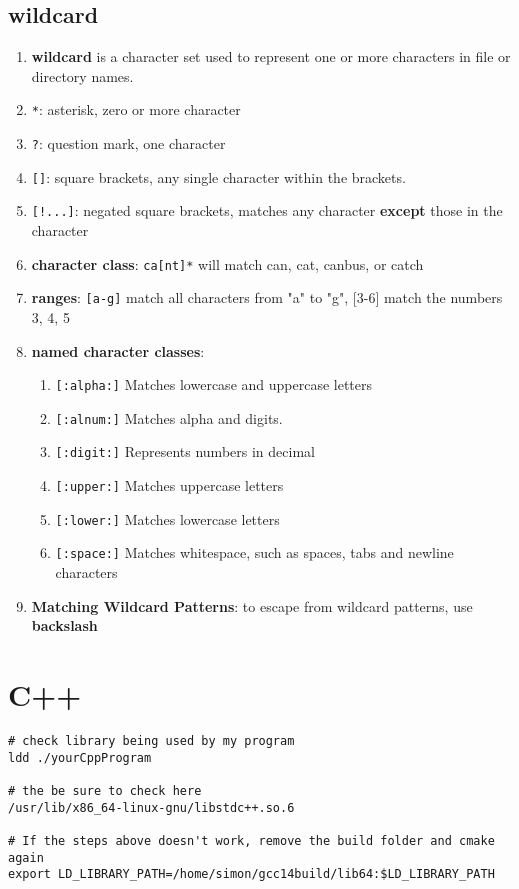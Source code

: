 \documentclass[12pt,a4paper]{article}
\begin{document}
\subsection{wildcard}
\begin{enumerate}
	\item \textbf{wildcard} is a character set used to represent one or more characters in file or directory names.
	\item \texttt{*}: asterisk, zero or more character
	\item \texttt{?}: question mark, one character
	\item \texttt{[]}: square brackets, any single character within the brackets.
	\item \texttt{[!...]}: negated square brackets, matches any character \textbf{except} those in the character
	\item \textbf{character class}: \texttt{ca[nt]*} will match can, cat, canbus, or catch
	\item \textbf{ranges}: \texttt{[a-g]} match all characters from "a" to "g", [3-6] match the numbers 3, 4, 5
	\item \textbf{named character classes}:
	\begin{enumerate}
		\item \texttt{[:alpha:]} Matches lowercase and uppercase letters
		\item \texttt{[:alnum:]} Matches alpha and digits.
		\item \texttt{[:digit:]} Represents numbers in decimal
		\item \texttt{[:upper:]} Matches uppercase letters
		\item \texttt{[:lower:]} Matches lowercase letters
		\item \texttt{[:space:]} Matches whitespace, such as spaces, tabs and newline characters
	\end{enumerate}		
	\item \textbf{Matching Wildcard Patterns}: to escape from wildcard patterns, use \textbf{backslash}
\end{enumerate}

\section{C++}
\begin{footnotesize}
\begin{verbatim}
# check library being used by my program
ldd ./yourCppProgram

# the be sure to check here
/usr/lib/x86_64-linux-gnu/libstdc++.so.6

# If the steps above doesn't work, remove the build folder and cmake again
export LD_LIBRARY_PATH=/home/simon/gcc14build/lib64:$LD_LIBRARY_PATH
\end{verbatim}
\end{footnotesize}
\end{document}
